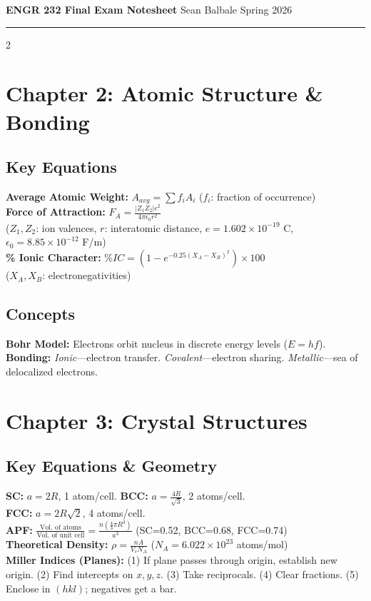 \documentclass[7pt]{article}
\date{}
\begin{document}
\normalsize \textbf{ENGR 232 Final Exam Notesheet} \hfill Sean Balbale \hfill Spring 2026 \vspace{0.08cm}
\hrule
\vspace{0.06cm}
\begin{multicols*}{2}

\section*{Chapter 2: Atomic Structure \& Bonding}
\subsection*{Key Equations}
\textbf{Average Atomic Weight:} $A_{avg} = \sum f_i A_i$ \quad ($f_i$: fraction of occurrence) \\
\textbf{Force of Attraction:} $F_A = \frac{|Z_1 Z_2| e^2}{4\pi\epsilon_0 r^2}$ \\
($Z_1,Z_2$: ion valences, $r$: interatomic distance, $e=1.602\times10^{-19}$ C, $\epsilon_0=8.85\times10^{-12}$ F/m) \\
\textbf{\% Ionic Character:} $\%IC = \left(1-e^{-0.25(X_A-X_B)^2}\right)\times 100$ \\
($X_A, X_B$: electronegativities)
\subsection*{Concepts}
\textbf{Bohr Model:} Electrons orbit nucleus in discrete energy levels ($E=hf$). \\
\textbf{Bonding:} \textit{Ionic}—electron transfer. \textit{Covalent}—electron sharing. \textit{Metallic}—sea of delocalized electrons.

\section*{Chapter 3: Crystal Structures}
\subsection*{Key Equations \& Geometry}
\textbf{SC:} $a=2R$, 1 atom/cell. \quad \textbf{BCC:} $a=\frac{4R}{\sqrt{3}}$, 2 atoms/cell. \\
\textbf{FCC:} $a=2R\sqrt{2}$, 4 atoms/cell. \\
\textbf{APF:} $\frac{\text{Vol. of atoms}}{\text{Vol. of unit cell}} = \frac{n(\frac{4}{3}\pi R^3)}{a^3}$ \quad (SC=0.52, BCC=0.68, FCC=0.74) \\
\textbf{Theoretical Density:} $\rho = \frac{nA}{V_c N_A}$ \quad ($N_A=6.022\times10^{23}$ atoms/mol) \\
\textbf{Miller Indices (Planes):} (1) If plane passes through origin, establish new origin. (2) Find intercepts on $x,y,z$. (3) Take reciprocals. (4) Clear fractions. (5) Enclose in $(hkl)$; negatives get a bar.

\end{multicols*}
\end{document}

